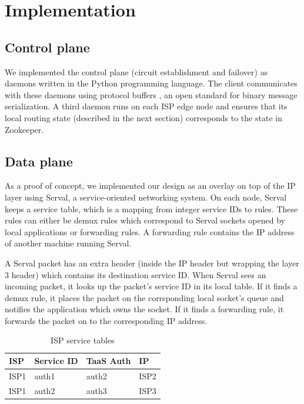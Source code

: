 \documentclass{article}
\begin{document}
\section{Implementation}
\subsection{Control plane}
We implemented the control plane (circuit establishment and failover)
as daemons written in the Python programming language. The client
communicates with these daemons using protocol buffers
\cite{protobuf}, an open standard for binary message serialization. A
third daemon runs on each ISP edge node and ensures that its local
routing state (described in the next section) corresponds to the state
in Zookeeper.
\subsection{Data plane}
As a proof of concept, we implemented our design as an overlay on top
of the IP layer using Serval, a service-oriented networking system. On
each node, Serval keeps a service table, which is a mapping from
integer service IDs to rules. These rules can either be demux rules
which correspond to Serval sockets opened by local applications or
forwarding rules. A forwarding rule contains the IP address of another
machine running Serval.

A Serval packet has an extra header (inside the IP header but wrapping
the layer 3 header) which contains its destination service ID. When
Serval sees an incoming packet, it looks up the packet's service ID in
its local table. If it finds a demux rule, it places the packet on
the corrsponding local socket's queue and notifies the application
which owns the socket. If it finds a forwarding rule, it forwards the
packet on to the corresponding IP address.

\begin{table}
\centering
\begin{tabular}{| l | l | l | l | }
  \hline
  ISP & Service ID & TaaS Auth & IP \\ \hline
  ISP1 & auth1 & auth2 & ISP2 \\ \hline
  ISP1 & auth2 & auth3 & ISP3 \\ \hline
\end{tabular}
\caption{ISP service tables}
\label{table:servicetables}
\end{table}
\end{document}
